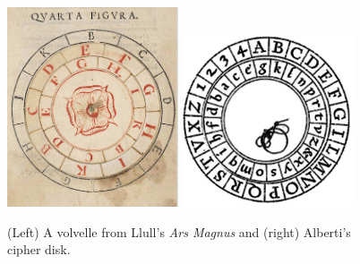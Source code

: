 \begin{figure}[t]
    \centering

    \includegraphics[width=0.45\textwidth]{ch2/images/llull_volvelle.png}\hfill
    \includegraphics[width=0.45\textwidth]{ch2/images/alberti_cipher_disk.jpg}

\caption{(Left) A volvelle from  Llull's \textit{Ars Magnus} and (right)
Alberti's cipher disk.}
\label{fig:llull_volvelle}
\end{figure}
